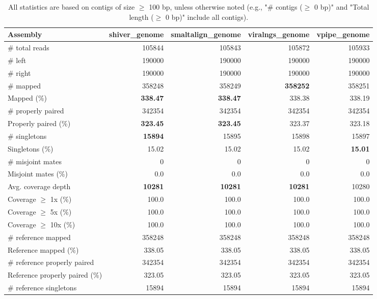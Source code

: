 \documentclass[12pt,a4paper]{article}
\begin{document}
\begin{table}[ht]
\begin{center}
\caption{All statistics are based on contigs of size $\geq$ 100 bp, unless otherwise noted (e.g., "\# contigs ($\geq$ 0 bp)" and "Total length ($\geq$ 0 bp)" include all contigs).}
\begin{tabular}{|l*{4}{|r}|}
\hline
Assembly & shiver\_genome & smaltalign\_genome & viralngs\_genome & vpipe\_genome \\ \hline
\# total reads & 105844 & 105843 & 105872 & 105933 \\ \hline
\# left & 190000 & 190000 & 190000 & 190000 \\ \hline
\# right & 190000 & 190000 & 190000 & 190000 \\ \hline
\# mapped & 358248 & 358249 & {\bf 358252} & 358251 \\ \hline
Mapped (\%) & {\bf 338.47} & {\bf 338.47} & 338.38 & 338.19 \\ \hline
\# properly paired & 342354 & 342354 & 342354 & 342354 \\ \hline
Properly paired (\%) & {\bf 323.45} & {\bf 323.45} & 323.37 & 323.18 \\ \hline
\# singletons & {\bf 15894} & 15895 & 15898 & 15897 \\ \hline
Singletons (\%) & 15.02 & 15.02 & 15.02 & {\bf 15.01} \\ \hline
\# misjoint mates & 0 & 0 & 0 & 0 \\ \hline
Misjoint mates (\%) & 0.0 & 0.0 & 0.0 & 0.0 \\ \hline
Avg. coverage depth & {\bf 10281} & {\bf 10281} & {\bf 10281} & 10280 \\ \hline
Coverage $\geq$ 1x (\%) & 100.0 & 100.0 & 100.0 & 100.0 \\ \hline
Coverage $\geq$ 5x (\%) & 100.0 & 100.0 & 100.0 & 100.0 \\ \hline
Coverage $\geq$ 10x (\%) & 100.0 & 100.0 & 100.0 & 100.0 \\ \hline
\# reference mapped & 358248 & 358248 & 358248 & 358248 \\ \hline
Reference mapped (\%) & 338.05 & 338.05 & 338.05 & 338.05 \\ \hline
\# reference properly paired & 342354 & 342354 & 342354 & 342354 \\ \hline
Reference properly paired (\%) & 323.05 & 323.05 & 323.05 & 323.05 \\ \hline
\# reference singletons & 15894 & 15894 & 15894 & 15894 \\ \hline

\end{tabular}
\end{center}
\end{table}
\end{document}
